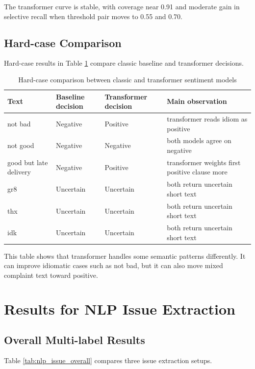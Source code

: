 \documentclass[12pt,a4paper]{article}
\begin{document}
The transformer curve is stable, with coverage near 0.91 and moderate gain in selective recall when threshold pair moves to 0.55 and 0.70.

\subsection{Hard-case Comparison}
Hard-case results in Table \ref{tab:nlp_hard_cases} compare classic baseline and transformer decisions.

\begin{table}[H]
\centering
\caption{Hard-case comparison between classic and transformer sentiment models}
\label{tab:nlp_hard_cases}
\begin{tabular}{>{\raggedright\arraybackslash}p{4.1cm} >{\centering\arraybackslash}p{2.3cm} >{\centering\arraybackslash}p{2.3cm} >{\raggedright\arraybackslash}p{4.3cm}}
\toprule
Text & Baseline decision & Transformer decision & Main observation \\
\midrule
not bad & Negative & Positive & transformer reads idiom as positive \\
not good & Negative & Negative & both models agree on negative \\
good but late delivery & Negative & Positive & transformer weights first positive clause more \\
gr8 & Uncertain & Uncertain & both return uncertain short text \\
thx & Uncertain & Uncertain & both return uncertain short text \\
idk & Uncertain & Uncertain & both return uncertain short text \\
\bottomrule
\end{tabular}
\end{table}

This table shows that transformer handles some semantic patterns differently. It can improve idiomatic cases such as not bad, but it can also move mixed complaint text toward positive.

\section{Results for NLP Issue Extraction}
\subsection{Overall Multi-label Results}
Table \ref{tab:nlp_issue_overall} compares three issue extraction setups.
\end{document}
